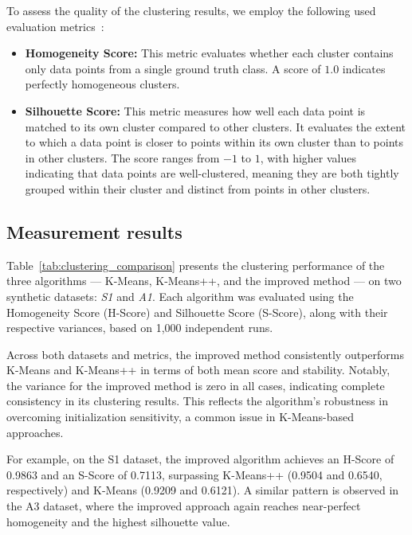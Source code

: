\documentclass[10pt,twocolumn,letterpaper]{article}
\begin{document}
To assess the quality of the clustering results, we employ the following used
evaluation metrics~\cite{Abdullah10601123}:

\begin{itemize}
    \item \textbf{Homogeneity Score:} This metric evaluates whether each cluster contains only data points from a single ground truth class. A score of $1.0$ indicates perfectly homogeneous clusters.
    \item \textbf{Silhouette Score:} This metric measures how well each data point is matched to its own cluster compared to other clusters. It evaluates the extent to which a data point is closer to points within its own cluster than to points in other clusters. The score ranges from $-1$ to $1$, with higher values indicating that data points are well-clustered, meaning they are both tightly grouped within their cluster and distinct from points in other clusters.
\end{itemize}


\subsection{Measurement results}\label{subsec:measurement-results}

Table~\ref{tab:clustering_comparison} presents the clustering performance of
the three algorithms — K-Means, K-Means++, and the improved method — on two
synthetic datasets: \textit{S1} and \textit{A1}. Each algorithm was evaluated
using the Homogeneity Score (H-Score) and Silhouette Score (S-Score), along
with their respective variances, based on 1,000 independent runs.

Across both datasets and metrics, the improved method consistently outperforms
K-Means and K-Means++ in terms of both mean score and stability. Notably, the
variance for the improved method is zero in all cases, indicating complete
consistency in its clustering results. This reflects the algorithm’s robustness
in overcoming initialization sensitivity, a common issue in K-Means-based
approaches.

For example, on the S1 dataset, the improved algorithm achieves an H-Score of
0.9863 and an S-Score of 0.7113, surpassing K-Means++ (0.9504 and 0.6540,
respectively) and K-Means (0.9209 and 0.6121). A similar pattern is observed in
the A3 dataset, where the improved approach again reaches near-perfect
homogeneity and the highest silhouette value.
\end{document}
